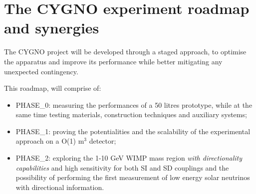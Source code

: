 \documentclass[physics,article,submit,moreauthors,pdftex]{Definitions/mdpi}
\begin{document}



\section{The CYGNO experiment roadmap and synergies}
The CYGNO project will be developed through a staged approach, to optimise the apparatus and improve its performance while better mitigating any unexpected contingency. 



This roadmap, will comprise of:


\begin{itemize}
    \item PHASE\_0: measuring the performances of a 50 litres prototype, while at the same time testing materials, construction techniques and auxiliary systems;
    \item PHASE\_1: proving the potentialities and the scalability of the experimental approach 
    on a O(1) m$^3$ detector;
    \item PHASE\_2: exploring the 1-10 GeV WIMP mass region \emph{with directionality capabilities} and high sensitivity for both SI and SD couplings and the possibility of performing the first measurement of low energy solar neutrinos with directional information. 
\end{itemize}
\end{document}
